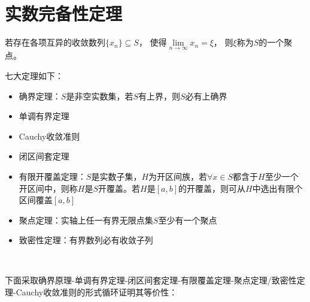 


\chapter{实数完备性定理}

\begin{definition}[聚点]
  若存在各项互异的收敛数列$\{x_n\} \subseteq S$，
  使得$\lim \limits _{n \rightarrow \infty} x_n = \xi$，
  则$\xi$称为$S$的一个聚点。
\end{definition}

\begin{theorem}[实数七大定理]
  七大定理如下：
  \begin{itemize}
  \item 确界定理：$S$是非空实数集，若$S$有上界，则$S$必有上确界
  \item 单调有界定理
  \item Cauchy收敛准则
  \item 闭区间套定理
  \item 有限开覆盖定理：$S$是实数子集，$H$为开区间族，若$\forall x \in S$都含于$H$至少一个开区间中，则称$H$是$S$开覆盖。若$H$是$[a,b]$的开覆盖，则可从$H$中选出有限个区间覆盖$[a,b]$
  \item 聚点定理：实轴上任一有界无限点集$S$至少有一个聚点
  \item 致密性定理：有界数列必有收敛子列
  \end{itemize}
\end{theorem}

~

下面采取确界原理-单调有界定理-闭区间套定理-有限覆盖定理-聚点定理/致密性定理-Cauchy收敛准则的形式循环证明其等价性：

